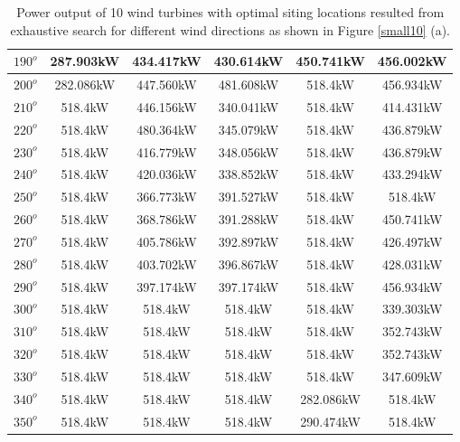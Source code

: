 \begin{table}[H]
\begin{tabular}{|c|c|c|c|c|c|}
        		$190^o$	& 287.903kW	& 434.417kW	& 430.614kW	& 450.741kW	& 456.002kW	\\ \hline
        		$200^o$	& 282.086kW	& 447.560kW	& 481.608kW	& 518.4kW	& 456.934kW	\\ \hline
        		$210^o$	& 518.4kW	& 446.156kW	& 340.041kW	& 518.4kW	& 414.431kW	\\ \hline
        		$220^o$	& 518.4kW	& 480.364kW	& 345.079kW	& 518.4kW	& 436.879kW	\\ \hline
        		$230^o$	& 518.4kW	& 416.779kW	& 348.056kW	& 518.4kW	& 436.879kW	\\ \hline
        		$240^o$	& 518.4kW	& 420.036kW	& 338.852kW	& 518.4kW	& 433.294kW	\\ \hline
        		$250^o$	& 518.4kW	& 366.773kW	& 391.527kW	& 518.4kW	& 518.4kW	\\ \hline
        		$260^o$	& 518.4kW	& 368.786kW	& 391.288kW	& 518.4kW	& 450.741kW	\\ \hline
        		$270^o$	& 518.4kW	& 405.786kW	& 392.897kW	& 518.4kW	& 426.497kW	\\ \hline
        		$280^o$	& 518.4kW	& 403.702kW	& 396.867kW	& 518.4kW	& 428.031kW	\\ \hline
        		$290^o$	& 518.4kW	& 397.174kW	& 397.174kW	& 518.4kW	& 456.934kW	\\ \hline
        		$300^o$	& 518.4kW	& 518.4kW	& 518.4kW	& 518.4kW	& 339.303kW	\\ \hline
        		$310^o$	& 518.4kW	& 518.4kW	& 518.4kW	& 518.4kW	& 352.743kW	\\ \hline
        		$320^o$	& 518.4kW	& 518.4kW	& 518.4kW	& 518.4kW	& 352.743kW	\\ \hline
        		$330^o$	& 518.4kW	& 518.4kW	& 518.4kW	& 518.4kW	& 347.609kW	\\ \hline
        		$340^o$	& 518.4kW	& 518.4kW	& 518.4kW	& 282.086kW	& 518.4kW	\\ \hline
        		$350^o$	& 518.4kW	& 518.4kW	& 518.4kW	& 290.474kW	& 518.4kW	\\ \hline
        	\end{tabular}
        	\caption{Power output of 10 wind turbines with optimal siting locations resulted from exhaustive search for different wind directions as shown in Figure \ref{small10} (a).}
        	\label{table10a}
        \end{table}
